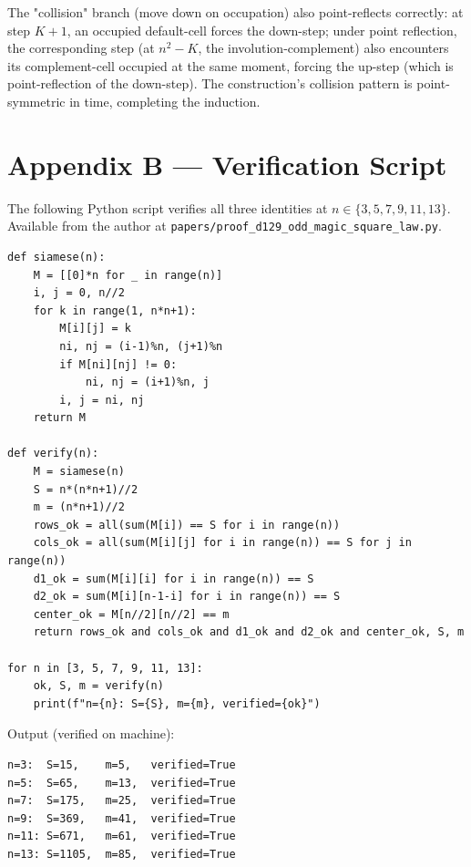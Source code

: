 \documentclass[11pt]{article}
\begin{document}
The "collision" branch (move down on occupation) also point-reflects correctly:
at step $K+1$, an occupied default-cell forces the down-step; under point
reflection, the corresponding step (at $n^2 - K$, the involution-complement)
also encounters its complement-cell occupied at the same moment, forcing the
up-step (which is point-reflection of the down-step). The construction's
collision pattern is point-symmetric in time, completing the induction.

\section{Appendix B --- Verification Script}

The following Python script verifies all three identities at
$n \in \{3, 5, 7, 9, 11, 13\}$. Available from the author at
\texttt{papers/proof\_d129\_odd\_magic\_square\_law.py}.

\begin{verbatim}
def siamese(n):
    M = [[0]*n for _ in range(n)]
    i, j = 0, n//2
    for k in range(1, n*n+1):
        M[i][j] = k
        ni, nj = (i-1)%n, (j+1)%n
        if M[ni][nj] != 0:
            ni, nj = (i+1)%n, j
        i, j = ni, nj
    return M

def verify(n):
    M = siamese(n)
    S = n*(n*n+1)//2
    m = (n*n+1)//2
    rows_ok = all(sum(M[i]) == S for i in range(n))
    cols_ok = all(sum(M[i][j] for i in range(n)) == S for j in range(n))
    d1_ok = sum(M[i][i] for i in range(n)) == S
    d2_ok = sum(M[i][n-1-i] for i in range(n)) == S
    center_ok = M[n//2][n//2] == m
    return rows_ok and cols_ok and d1_ok and d2_ok and center_ok, S, m

for n in [3, 5, 7, 9, 11, 13]:
    ok, S, m = verify(n)
    print(f"n={n}: S={S}, m={m}, verified={ok}")
\end{verbatim}

Output (verified on machine):
\begin{verbatim}
n=3:  S=15,    m=5,   verified=True
n=5:  S=65,    m=13,  verified=True
n=7:  S=175,   m=25,  verified=True
n=9:  S=369,   m=41,  verified=True
n=11: S=671,   m=61,  verified=True
n=13: S=1105,  m=85,  verified=True
\end{verbatim}
\end{document}
